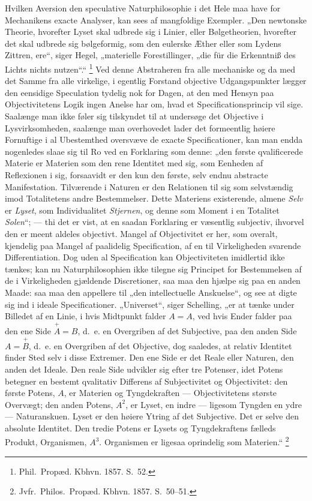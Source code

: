 \documentclass[12pt]{book}
\newcommand{\opage}[1]{\marginnote{\footnotesize\textit{[#1]}}}
\begin{document}
Hvilken Aversion den speculative Naturphilosophie i det Hele maa have for Mechanikens
exacte Analyser, kan sees af mangfoldige Exempler. „Den newtonske Theorie, hvorefter
Lyset skal udbrede sig i Linier, eller Bølgetheorien, hvorefter det skal udbrede sig
bølgeformig, som den eulerske Æther eller som Lydens Zittren, ere“, siger Hegel,
„materielle Forestillinger, „die für die Erkenntniß des Lichts nichts nutzen“.“%
\footnote{Phil.\ Propæd. Kbhvn. 1857. S.~52.}
Ved denne Abstraheren fra alle mechaniske og da med det Samme fra alle virkelige, i
egentlig Forstand objective Udgangspunkter lægger den eensidige Speculation tydelig
nok for Dagen, at den med Hensyn paa Objectivitetens Logik ingen
\opage{333} Anelse har om, hvad et Specificationsprincip vil sige. Saalænge man ikke føler sig
tilskyndet til at undersøge det Objective i Lysvirksomheden, saalænge man overhovedet
lader det formeentlig høiere Fornuftige i al Ubestemthed oversvæve de exacte
Specificationer, kan man endda nogenledes slaae sig til Ro ved en Forklaring som
denne: „den første qvalificerede Materie er Materien som den rene Identitet med sig,
som Eenheden af Reflexionen i sig, forsaavidt er den kun den første, selv endnu
abstracte Manifestation. Tilværende i Naturen er den Relationen til sig som
selvstændig imod Totalitetens andre Bestemmelser. Dette Materiens existerende, almene
\emph{Selv} er \emph{Lyset}, som Individualitet \emph{Stjernen}, og denne som Moment i
en Totalitet \emph{Solen}“; — thi det er vist, at en saadan Forklaring er væsentlig
subjectiv, ihvorvel den er meent aldeles objectivt. Mangel af Objectivitet er her, som
overalt, kjendelig paa Mangel af paalidelig Specification, af en til Virkeligheden
svarende Differentiation. Dog uden al Specification kan Objectiviteten imidlertid ikke
tænkes; kan nu Naturphilosophien ikke tilegne sig Principet for Bestemmelsen af de i
Virkeligheden gjældende Discretioner, saa maa den hjælpe sig paa en anden Maade: saa
maa den appellere til „den intellectuelle Anskuelse“, og see at digte sig ind i ideale
Specificationer. „Universet“, siger Schelling, „er at tænke under Billedet af en
Linie, i hvis Midtpunkt falder $A = A$, ved hvis Ender falder paa den ene Side
$\overset{+}{A} = B$, d.\ e. en Overgriben af det Subjective, paa den anden Side
$A = \overset{+}{B}$, d.\ e. en Overgriben af det Objective, dog saaledes, at relativ
Identitet finder Sted selv i disse Extremer. Den ene Side er det Reale eller Naturen,
den anden det Ideale. Den reale Side udvikler sig efter tre Potenser, idet Potens
betegner en bestemt qvalitativ Differens af Subjectivitet og Objectivitet: den første
Potens, $A$, er
\opage{334} Materien og Tyngdekraften — Objectivitetens største Overvægt; den anden Potens, $A^{2}$,
er Lyset, en indre — ligesom Tyngden en ydre — Naturanskuen. Lyset er den høiere Ytring
af det Subjective. Det er selve den absolute Identitet. Den tredie Potens er Lysets og
Tyngdekraftens fælleds Produkt, Organismen, $A^{3}$. Organismen er ligesaa oprindelig
som Materien.“%
\footnote{Jvfr.\ Philos.\ Propæd. Kbhvn. 1857. S.~50--51.}
\end{document}
